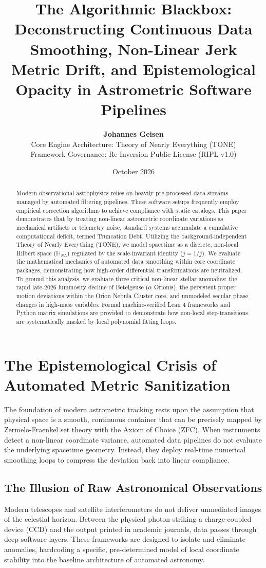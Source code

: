 \documentclass[11pt,a4paper]{article}
\title{\textbf{The Algorithmic Blackbox: Deconstructing Continuous Data Smoothing, Non-Linear Jerk Metric Drift, and Epistemological Opacity in Astrometric Software Pipelines}}
\author{\textbf{Johannes Geisen} \\ \small Core Engine Architecture: Theory of Nearly Everything (TONE) \\ \small Framework Governance: Re-Inversion Public License (RIPL v1.0)}
\date{October 2026}
\theoremstyle{plain}
\theoremstyle{definition}
\begin{document}
\maketitle

\begin{abstract}
Modern observational astrophysics relies on heavily pre-processed data streams managed by automated filtering pipelines. These software setups frequently employ empirical correction algorithms to achieve compliance with static catalogs. This paper demonstrates that by treating non-linear astrometric coordinate variations as mechanical artifacts or telemetry noise, standard systems accumulate a cumulative computational deficit, termed Truncation Debt. Utilizing the background-independent Theory of Nearly Everything (TONE), we model spacetime as a discrete, non-local Hilbert space ($\mathbb{H}_{NL}$) regulated by the scale-invariant identity ($j = 1/j$). We evaluate the mathematical mechanics of automated data smoothing within core coordinate packages, demonstrating how high-order differential transformations are neutralized. To ground this analysis, we evaluate three critical non-linear stellar anomalies: the rapid late-2026 luminosity decline of Betelgeuse ($\alpha$ Orionis), the persistent proper motion deviations within the Orion Nebula Cluster core, and unmodeled secular phase changes in high-mass variables. Formal machine-verified Lean 4 frameworks and Python matrix simulations are provided to demonstrate how non-local step-transitions are systematically masked by local polynomial fitting loops.
\end{abstract}

\newpage
\tableofcontents
\newpage

\section{The Epistemological Crisis of Automated Metric Sanitization}
The foundation of modern astrometric tracking rests upon the assumption that physical space is a smooth, continuous container that can be precisely mapped by Zermelo-Fraenkel set theory with the Axiom of Choice (ZFC). When instruments detect a non-linear coordinate variance, automated data pipelines do not evaluate the underlying spacetime geometry. Instead, they deploy real-time numerical smoothing loops to compress the deviation back into linear compliance.

\subsection{The Illusion of Raw Astronomical Observations}
Modern telescopes and satellite interferometers do not deliver unmediated images of the celestial horizon. Between the physical photon striking a charge-coupled device (CCD) and the output printed in academic journals, data passes through deep software layers. These frameworks are designed to isolate and eliminate anomalies, hardcoding a specific, pre-determined model of local coordinate stability into the baseline architecture of automated astronomy.
\end{document}
